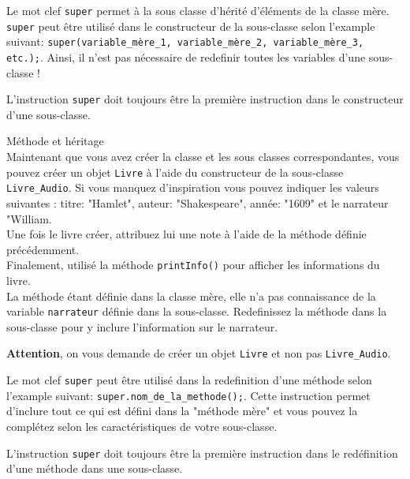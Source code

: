 \begin{Exercice}[10 minutes]
\begin{conseil}
Le mot clef \lstinline{super} permet à la sous classe d'hérité d'éléments de la classe mère. \lstinline{super} peut être utilisé dans le constructeur de la sous-classe selon l'example suivant: \lstinline{super(variable_mère_1, variable_mère_2, variable_mère_3, etc.);}. Ainsi, il n'est pas nécessaire de redefinir toutes les variables d'une sous-classe !

L'instruction \lstinline{super} doit toujours être la première instruction dans le constructeur d'une sous-classe. 
\end{conseil}

\begin{solution}
	
\end{solution}

\end{Exercice}

\begin{Exercice}[5 minutes] Méthode et héritage \\

Maintenant que vous avez créer la classe et les sous classes correspondantes, vous pouvez créer un objet \lstinline{Livre} à l'aide du constructeur de la sous-classe \lstinline{Livre_Audio}. Si vous manquez d'inspiration vous pouvez indiquer les valeurs suivantes : titre: "Hamlet", auteur: "Shakespeare", année: "1609" et le narrateur "William.\\

Une fois le livre créer, attribuez lui une note à l'aide de la méthode définie précédemment.\\ 

Finalement, utilisé la méthode \lstinline{printInfo()} pour afficher les informations du livre.\\

La méthode étant définie dans la classe mère, elle n'a pas connaissance de la variable \lstinline{narrateur} définie dans la sous-classe. Redefinissez la méthode dans la sous-classe pour y inclure l'information sur le narrateur. \\

\begin{conseil}
\textbf{Attention}, on vous demande de créer un objet \lstinline{Livre} et non pas \lstinline{Livre_Audio}.

Le mot clef \lstinline{super} peut être utilisé dans la redefinition d'une méthode selon l'example suivant: \lstinline{super.nom_de_la_methode();}. Cette instruction permet  d'inclure tout ce qui est défini dans la "méthode mère" et vous pouvez la complétez selon les caractéristiques de votre sous-classe.

L'instruction \lstinline{super} doit toujours être la première instruction dans le redéfinition d'une méthode dans une sous-classe. 
\end{conseil}

\begin{solution}
	
	
\end{solution}

\end{Exercice}


